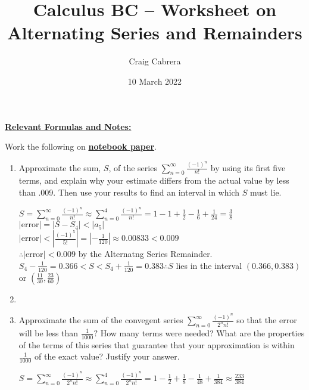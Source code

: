 \documentclass[10pt,letterpaper]{report}
\title{Calculus BC -- Worksheet on Alternating Series and Remainders}
\author{Craig Cabrera}
\date{10 March 2022}
\begin{document}
\maketitle
\begin{center}
  \textbf{\underline{Relevant Formulas and Notes:}}
\end{center}

\pagebreak 


Work the following on \textbf{\underline{notebook paper}}.
\begin{enumerate}
  \item{Approximate the sum, $S$, of the series $\sum_{n=0}^{\infty}{\frac{(-1)^{n}}{n!}}$ by using its first five terms, and explain why your estimate differs from the actual value by less than .009. Then use your results to find an interval in which $S$ must lie. \\}
  
    $S=\sum_{n=0}^{\infty}{\frac{(-1)^{n}}{n!}}\approx \sum_{n=0}^{4}{\frac{(-1)^{n}}{n!}}= 1 - 1 + \frac{1}{2} - \frac{1}{6} + \frac{1}{24} = \frac{3}{8}$ \\
    
    $|\text{error}| = |S-S_{4}| < |a_{5}|$ \\
    
    $|\text{error}| < |\frac{(-1)^5}{5!}| = |-\frac{1}{120}| \approx 0.00833 < 0.009 $ \\
    
    $\therefore |\text{error}| < 0.009 $ by the Alternatng Series Remainder. \\
    
    $S_{4} - \frac{1}{120} = 0.366 < S < S_{4} + \frac{1}{120} = 0.383 \therefore S $ lies in the interval $(0.366, 0.383)$ or $(\frac{11}{30}, \frac{23}{60})$ \\
    
  \item{}
    
  \item{Approximate the sum of the convegent series $\sum_{n=0}^{\infty}{\frac{(-1)^{n}}{2^{n}n!}}$ so that the error will be less than $\frac{1}{1000}?$ How many terms were needed? What are the properties of the terms of this series that guarantee that your approximation is within $\frac{1}{1000}$ of the exact value? Justify your answer. \\}
  
    $S = \sum_{n=0}^{\infty}{\frac{(-1)^{n}}{2^{n}n!}} \approx \sum_{n=0}^{4}{\frac{(-1)^{n}}{2^{n}n!}} = 1 - \frac{1}{2} + \frac{1}{8} - \frac{1}{48} + \frac{1}{384} \approx \frac{233}{384}$ \\
    

\end{enumerate}
\end{document}
